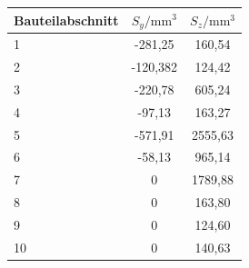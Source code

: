 \begin{center}
\begin{tabular}[h]{l|c|c}
	
Bauteilabschnitt&$S_{y}/\mathrm{mm}^3$&$S_{z}/\mathrm{mm}^3$\\
\hline
1& -281,25&160,54\\
2&-120,382&124,42\\
3&-220,78&605,24\\
4&-97,13&163,27\\
5&-571,91&2555,63\\
6&-58,13&965,14\\
7&0&1789,88\\
8&0&163,80\\
9&0&124,60\\
10&0&140,63\\
\end{tabular}
\end{center}

